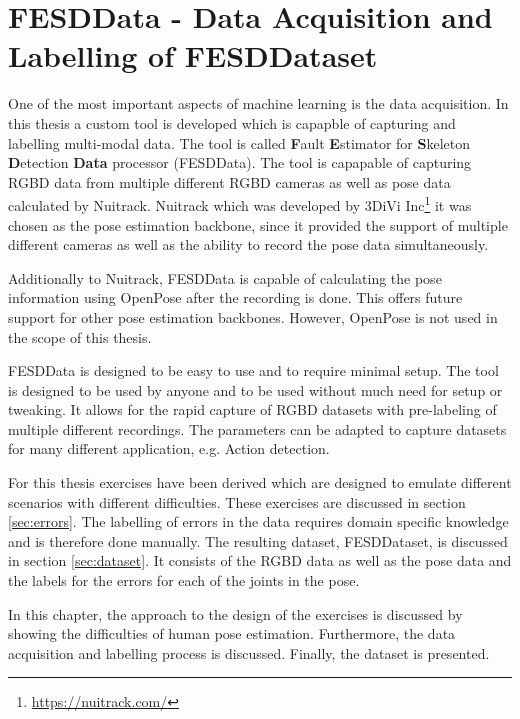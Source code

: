 \chapter[FESDData]{FESDData - Data Acquisition and Labelling of FESDDataset}
\label{sec:data_processing}

One of the most important aspects of machine learning is the data acquisition. In this thesis a custom tool is developed which is capapble of capturing and labelling multi-modal data. The tool is called \textbf{F}ault \textbf{E}stimator for \textbf{S}keleton \textbf{D}etection \textbf{Data} processor (FESDData). The tool is capapable of capturing RGBD data from multiple different RGBD cameras as well as pose data calculated by Nuitrack. Nuitrack which was developed by 3DiVi Inc\footnote{\url{https://nuitrack.com/}} it was chosen as the pose estimation backbone, since it provided the support of multiple different cameras as well as the ability to record the pose data simultaneously. 

Additionally to Nuitrack, FESDData is capable of calculating the pose information using OpenPose after the recording is done. This offers future support for other pose estimation backbones. However, OpenPose is not used in the scope of this thesis.

FESDData is designed to be easy to use and to require minimal setup. The tool is designed to be used by anyone and to be used without much need for setup or tweaking. It allows for the rapid capture of RGBD datasets with pre-labeling of multiple different recordings. The parameters can be adapted to capture datasets for many different application, e.g. Action detection. 

For this thesis exercises have been derived which are designed to emulate different scenarios with different difficulties. These exercises are discussed in section \ref{sec:errors}. The labelling of errors in the data requires domain specific knowledge and is therefore done manually. The resulting dataset, FESDDataset, is discussed in section \ref{sec:dataset}. It consists of the RGBD data as well as the pose data and the labels for the errors for each of the joints in the pose.

In this chapter, the approach to the design of the exercises is discussed by showing the difficulties of human pose estimation. Furthermore, the data acquisition and labelling process is discussed. Finally, the dataset is presented.






